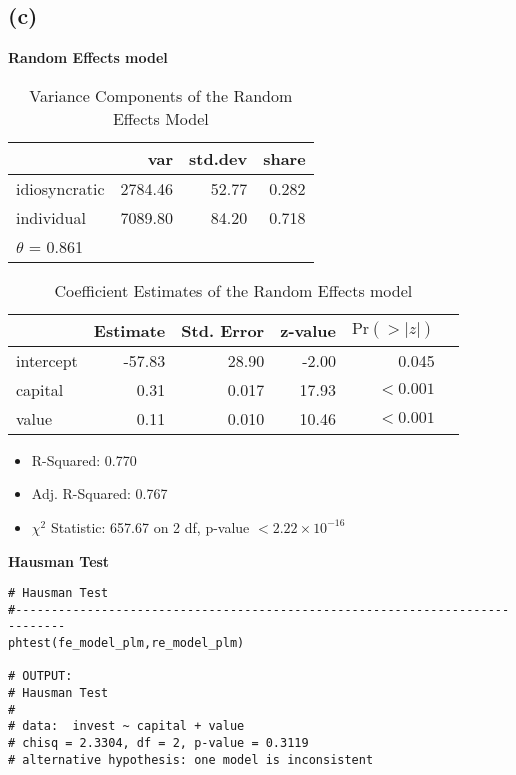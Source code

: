 \documentclass[a4paper]{article}
\begin{document}

\subsection*{(c)}
\textbf{Random Effects model}
\begin{table}[ht]
    \centering
    \begin{tabular}{lrrr}
        \toprule
            & var & std.dev & share \\
            \midrule
    idiosyncratic & 2784.46 & 52.77 & 0.282 \\
    individual    & 7089.80 & 84.20 & 0.718 \\
    \bottomrule
    \(\theta\) = 0.861\\
    \end{tabular}    
    \caption{Variance Components of the Random Effects Model}
\end{table}
\begin{table}[ht]
    \centering
    \begin{tabular}{@{}lrrrrr@{}}
        \toprule
                & Estimate  & Std. Error  & z-value & \(\text{Pr}(>|z|)\)\\
                \midrule
        intercept & -57.83 & 28.90 & -2.00 & 0.045 \\
        capital   & 0.31   & 0.017 & 17.93  & \(<0.001\)\\
        value     & 0.11   & 0.010 & 10.46 & \(<0.001\)\\
        \bottomrule
    \end{tabular}
    \caption{Coefficient Estimates of the Random Effects model}
\end{table}
\begin{itemize}
    \item R-Squared: 0.770
    \item Adj. R-Squared: 0.767
    \item \(\chi^2\) Statistic: 657.67 on 2 df, p-value \(<2.22 \times 10^{-16}\) 
\end{itemize}

\noindent\textbf{Hausman Test}

\begin{lstlisting}[caption={R Code for Hausman Test}]
# Hausman Test
#-----------------------------------------------------------------------------
phtest(fe_model_plm,re_model_plm)

# OUTPUT:
# Hausman Test
# 
# data:  invest ~ capital + value
# chisq = 2.3304, df = 2, p-value = 0.3119
# alternative hypothesis: one model is inconsistent
\end{lstlisting}
\end{document}
